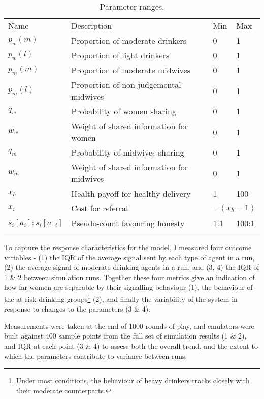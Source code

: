 \begin{table}
\caption[Parameter ranges for sensitivity analysis of the midwives and women disclosure game model]{Parameter ranges.}
\label{tab:sa_params}
\begin{tabular} {llll}
\hline\noalign{\smallskip}
Name & Description & Min & Max \\
\noalign{\smallskip}\svhline\noalign{\smallskip}
\(p_{w}(m)\) & Proportion of moderate drinkers & 0 & 1 \\ 
\(p_{w}(l)\) & Proportion of light drinkers & 0 & 1 \\ 
\(p_{m}(m)\) & Proportion of moderate midwives & 0 & 1 \\ 
\(p_{m}(l)\) & Proportion of non-judgemental midwives & 0 & 1 \\ 
\(q_{w}\) & Probability of women sharing & 0 & 1 \\ 
\(w_{w}\) & Weight of shared information for women & 0 & 1 \\ 
\(q_{m}\) & Probability of midwives sharing & 0 & 1 \\ 
\(w_{m}\) & Weight of shared information for midwives & 0 & 1 \\ 
\(x_{h}\) & Health payoff for healthy delivery & 1 & 100 \\ 
\(x_{r}\) & Cost for referral & \multicolumn{2}{l}{\(-(x_{h} - 1)\)} \\ 
\(s_{i}[a_{i}]:s_{i}[a_{\neg i}]\) & Pseudo-count favouring honesty & 1:1 & 100:1 \\
\noalign{\smallskip}\hline\noalign{\smallskip}
\end{tabular}
\end{table}

To capture the response characteristics for the model, I measured four outcome variables - (1) the \ac{IQR} of the average signal sent by each type of agent in a run, (2) the average signal of moderate drinking agents in a run, and (3, 4) the \ac{IQR} of 1 \& 2 between simulation runs. Together these four metrics give an indication of how far women are separable by their signalling behaviour (1), the behaviour of the at risk drinking groups\footnote{Under most conditions, the behaviour of heavy drinkers tracks closely with their moderate counterparts.} (2), and finally the variability of the system in response to changes to the parameters (3 \& 4).

Measurements were taken at the end of 1000 rounds of play, and emulators were built against 400 sample points from the full set of simulation results (1 \& 2), and \ac{IQR} at each point (3 \& 4) to assess both the overall trend, and the extent to which the parameters contribute to variance between runs.

